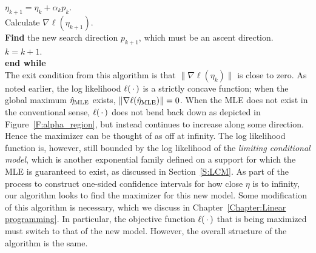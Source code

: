 $\eta_{k+1} = \eta_k + \alpha_k p_k$.\\
\indent Calculate $\nabla \ell( \eta_{k+1})$.\\
\indent \textbf{Find} the new search direction $p_{k+1}$, which must be an ascent 
direction. \\
\indent $k = k + 1$.  \\
\textbf{end while}\\

The exit condition from this algorithm is that $\lVert \nabla \ell( \eta_k) \rVert$
is close to zero.  As noted earlier, the log likelihood $\ell(\,\cdot\,)$ is a strictly
concave function; when the global maximum $\hat{\eta}_{\textrm{MLE}}$ exists, $\lVert \nabla \ell( \hat{\eta}_{\textrm{MLE}}) \rVert = 0$.  
When the MLE does not exist in the conventional sense, $\ell(\,\cdot\,)$ does not bend
 back down as depicted in Figure~\ref{F:alpha_region}, but instead continues to increase along some direction.  Hence the maximizer can be thought of as off at infinity.
The log likelihood function is, however, still bounded by 
the log likelihood of 
the \emph{limiting conditional model}, which 
is another exponential family defined on a support for which the MLE is
guaranteed to exist, as discussed in Section~\ref{S:LCM}.
As part of the process to construct one-sided confidence intervals 
for how close $\eta$ is to infinity, 
our algorithm looks to find the maximizer for this new model.  
Some modification of this algorithm is necessary, which we discuss in 
Chapter~\ref{Chapter:Linear programming}.  In particular, the objective function
$\ell( \,\cdot\,)$ that is being maximized must switch to that of the new model.
However, the overall structure of the algorithm is the same.

%
%
